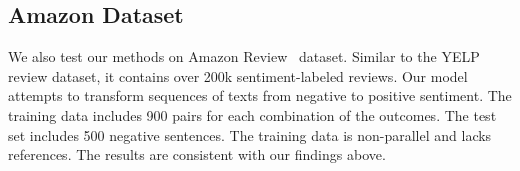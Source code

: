 \documentclass{article}
\begin{document}
\subsection{Amazon Dataset}
We also test our methods on Amazon Review~\cite{he2016ups} dataset. Similar to the YELP review dataset, it contains over 200k sentiment-labeled reviews. Our model attempts to transform sequences of texts from negative to positive sentiment. The training data includes 900 pairs for each combination of the outcomes. The test set includes 500 negative sentences. The training data is non-parallel and lacks references. The results are consistent with our findings above.
\begin{table*}[htbp]
    \centering
    \begin{small}
   
    \caption{\small Results for the Amazon datasets. PE stands for Prompt-Edit and D\&R stands for DeleteAndRetrieve. GM stands for geometric mean and HM stands for harmonic mean. Up-down arrows indicate whether higher or lower values are preferable. The best performance of each metric is highlighted in bold and the second-best is underlined. $*$ indicates that we did not compare the numbers of SSVAE with other methods due to its low generation quality.}
    \label{tab:results-amazon}
    \end{small}
\end{table*}
\end{document}
